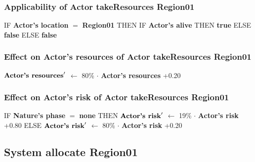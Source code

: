 \documentclass{article}%
\begin{document}
%
\subsubsection{Applicability of Actor takeResources Region01}%
\label{ssubsec:Applicability of Actor takeResources Region01}%
\begin{flushleft}%
IF %
\textbf{Actor's location}%
$=$%
\textbf{Region01}%
\linebreak%
\hspace*{2em}%
THEN %
IF %
\textbf{Actor's alive}%
\linebreak%
\hspace*{4em}%
THEN %
\textbf{true}%
\linebreak%
\hspace*{4em}%
ELSE %
\textbf{false}%
\linebreak%
\hspace*{2em}%
ELSE %
\textbf{false}%
\end{flushleft}

%
\subsubsection{Effect on Actor's resources of Actor takeResources Region01}%
\label{ssubsec:Effect on Actor's resources of Actor takeResources Region01}%
\begin{flushleft}%
$\mbox{\textbf{Actor's resources}} '$%
$\leftarrow$%
80\%%
$\cdot$%
\textbf{Actor's resources}%
+0.20%
\end{flushleft}

%
\subsubsection{Effect on Actor's risk of Actor takeResources Region01}%
\label{ssubsec:Effect on Actor's risk of Actor takeResources Region01}%
\begin{flushleft}%
IF %
\textbf{Nature's phase}%
$=$%
\textbf{none}%
\linebreak%
\hspace*{2em}%
THEN %
$\mbox{\textbf{Actor's risk}} '$%
$\leftarrow$%
19\%%
$\cdot$%
\textbf{Actor's risk}%
+0.80%
\linebreak%
\hspace*{2em}%
ELSE %
$\mbox{\textbf{Actor's risk}} '$%
$\leftarrow$%
80\%%
$\cdot$%
\textbf{Actor's risk}%
+0.20%
\end{flushleft}

%
\subsection{System allocate Region01}%
\label{subsec:System allocate Region01}%
\end{document}
